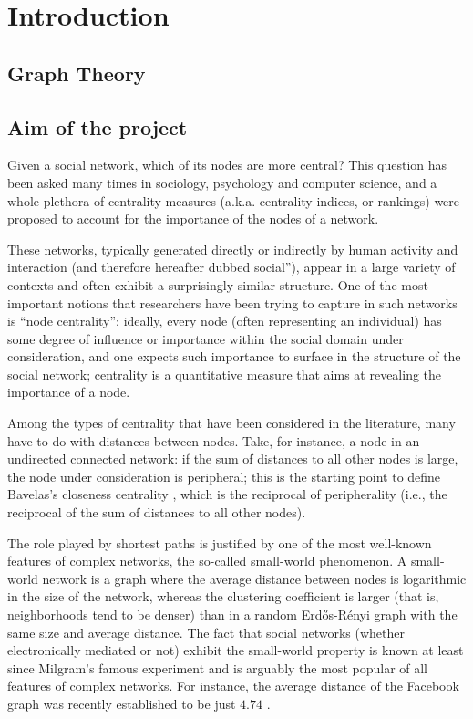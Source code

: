 
\section{Introduction}

\subsection{Graph Theory}

\lipsum[1]


\subsection{Aim of the project}
Given a social network, which of its nodes are more central? This question has been asked many times in sociology, psychology and computer science, and a whole plethora of centrality measures (a.k.a. centrality indices, or rankings) were proposed to account for the importance of the nodes of a network. \s

\nd These networks, typically generated directly or indirectly by human activity and interaction (and therefore hereafter dubbed social”), appear in a large variety of contexts and often exhibit a surprisingly similar structure. One of the most important notions that researchers have been trying to capture in such networks is “node centrality”: ideally, every node (often representing an individual) has some degree of influence or importance within the social domain under  consideration, and one expects such importance to surface in the structure of the social network; centrality is a quantitative measure that aims at revealing the importance of a node. \s

\nd Among the types of centrality that have been considered in the literature, many have to do with distances between nodes. Take, for instance, a node in an undirected connected network: if the sum of distances to all other nodes is large, the node under consideration is peripheral; this is the starting point to define Bavelas's closeness centrality \cite{closeness}, which is the reciprocal of peripherality (i.e., the reciprocal of the sum of distances to all other nodes). \s

\nd The role played by shortest paths is justified by one of the most well-known features of complex networks, the so-called small-world phenomenon. A small-world network \cite{cohen_havlin_2010} is a graph where the average distance between nodes is logarithmic in the size of the network, whereas the clustering coefficient is larger (that is, neighborhoods tend to be denser) than in a random Erdős-Rényi graph with the same size and average distance. The fact that social networks (whether electronically mediated or not) exhibit the small-world property is known at least since Milgram's famous experiment \cite{} and is arguably the most popular of all features of complex networks. For instance, the average distance of the Facebook graph was recently established to be just $4.74$ \cite{milgram1967small}. \s


